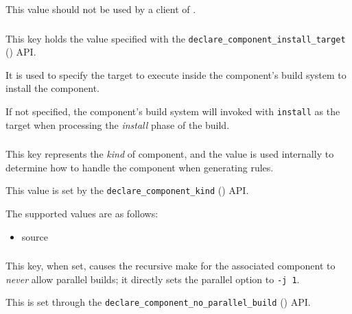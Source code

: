 This value should not be used by a client of \lmsbw.

\subsubsection{}
This key holds the value specified with the
\texttt{declare\_component\_install\_target}
() API.

It is used to specify the target to execute inside the component's
build system to install the component.

If not specified, the component's build system will invoked with
\texttt{install} as the target when processing the \emph{install}
phase of the build.

\subsubsection{}

This key represents the \emph{kind} of component, and the value is
used internally to determine how to handle the component when
generating rules.

This value is set by the \texttt{declare\_component\_kind}
() API.

The supported values are as follows:

\begin{itemize}
\item source
\end{itemize}

\subsubsection{}

This key, when set, causes the recursive make for the associated
component to \emph{never} allow parallel builds; it directly sets the
\gnumake parallel option to \texttt{-j 1}.

This is set through the
\texttt{declare\_component\_no\_parallel\_build}
() API.


\subsubsection{}

